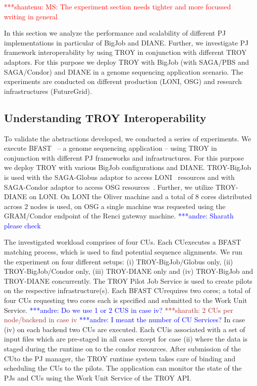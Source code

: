 \documentclass[conference,final]{IEEEtran}
\newcommand{\jhanote}[1]{ {\textcolor{red} { ***shantenu: #1 }}}
\newcommand{\alnote}[1]{ {\textcolor{blue} { ***andre: #1 }}}
\newcommand{\smnote}[1]{ {\textcolor{brown} { ***sharath: #1 }}}
\newcommand{\alnote}[1]{}
\newcommand{\smnote}[1]{}
\newcommand{\jhanote}[1]{}
\newcommand{\cu}{CU}
\newcommand{\upp}{\vspace*{-0.5em}}
\begin{document}
\jhanote{MS: The experiment section needs tighter and more focussed
  writing in general}

In this section we analyze the performance and scalability of
different PJ implementations in particular of BigJob and
DIANE. Further, we investigate PJ framework interoperability by using
TROY in conjunction with different TROY adaptors. For this purpose we
deploy TROY with BigJob (with SAGA/PBS and SAGA/Condor) and DIANE in a
genome sequencing application scenario. The experiments are conducted
on different production (LONI, OSG) and research infrastructures
(FutureGrid).

\subsection{Understanding TROY Interoperability\upp\upp}

To validate the abstractions developed, we conducted a series of
experiments. We execute BFAST~\cite{bfast2009} -- a genome sequencing
application -- using TROY in conjunction with different PJ frameworks
and infrastructures. For this purpose we deploy TROY with various
BigJob configurations and DIANE. TROY-BigJob is used with the
SAGA-Globus adaptor to access LONI~\cite{loni} resources and with
SAGA-Condor adaptor to access OSG
resources~\cite{1742-6596-78-1-012057}.  Further, we utilize
TROY-DIANE on LONI. On LONI the Oliver machine and a total of 8 cores
distributed across 2 nodes is used, on OSG a single machine was
requested using the GRAM/Condor endpoint of the Renci gateway machine.
\alnote{Sharath please check}

The investigated workload comprises of four \cu s. Each \cu  executes a BFAST
matching process, which is used to find potential sequence alignments. We run
the experiment on four different setups: (i) TROY-BigJob/Globus only, (ii)
TROY-BigJob/Condor only, (iii) TROY-DIANE only and (iv) TROY-BigJob and
TROY-DIANE concurrently. The TROY Pilot Job Service is used to create pilots on
the respective infrastructure(s). Each BFAST \cu  requires two cores; a total of
four \cu s requesting two cores each is specified and submitted to the Work Unit
Service. 
\alnote{Do we use 1 or 2 \cu S in case iv? }   
\smnote{2 \cu s per node/backend in case iv }\alnote{I meant the number of \cu  
Services?}
 In case (iv) on each backend two \cu s are executed. 
 Each \cu  is associated with a set of input files which are pre-staged in 
 all cases except for case (ii) where the data is staged during the runtime on
 to the condor resources. After
submission of the \cu  to the PJ manager, the TROY runtime system takes care of
binding and scheduling the \cu s to the pilots. The application can monitor the
state of the PJs and \cu s using the Work Unit Service of the TROY API.
\end{document}
